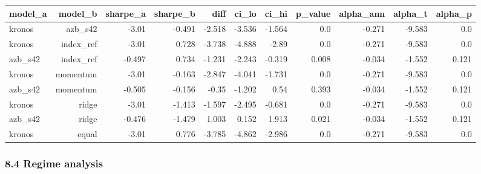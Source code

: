 \begin{center}\footnotesize\begin{longtable}{lrrrrrrrrrr}
\toprule
model\_a & model\_b & sharpe\_a & sharpe\_b & diff & ci\_lo & ci\_hi & p\_value & alpha\_ann & alpha\_t & alpha\_p \\
\midrule
kronos & azb\_s42 & -3.01 & -0.491 & -2.518 & -3.536 & -1.564 & 0.0 & -0.271 & -9.583 & 0.0 \\
kronos & index\_ref & -3.01 & 0.728 & -3.738 & -4.888 & -2.89 & 0.0 & -0.271 & -9.583 & 0.0 \\
azb\_s42 & index\_ref & -0.497 & 0.734 & -1.231 & -2.243 & -0.319 & 0.008 & -0.034 & -1.552 & 0.121 \\
kronos & momentum & -3.01 & -0.163 & -2.847 & -4.041 & -1.731 & 0.0 & -0.271 & -9.583 & 0.0 \\
azb\_s42 & momentum & -0.505 & -0.156 & -0.35 & -1.202 & 0.54 & 0.393 & -0.034 & -1.552 & 0.121 \\
kronos & ridge & -3.01 & -1.413 & -1.597 & -2.495 & -0.681 & 0.0 & -0.271 & -9.583 & 0.0 \\
azb\_s42 & ridge & -0.476 & -1.479 & 1.003 & 0.152 & 1.913 & 0.021 & -0.034 & -1.552 & 0.121 \\
kronos & equal & -3.01 & 0.776 & -3.785 & -4.862 & -2.986 & 0.0 & -0.271 & -9.583 & 0.0 \\
\bottomrule
\end{longtable}\end{center}

\subsubsection*{8.4 Regime analysis}

